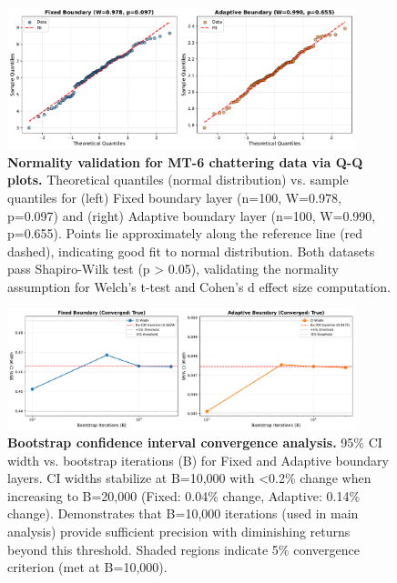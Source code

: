 %
%

\begin{figure}[htbp]
\centering
\includegraphics[width=0.9\textwidth]{figures/figure_vi_1_normality_validation.pdf}
\caption{%
\textbf{Normality validation for MT-6 chattering data via Q-Q plots.}
Theoretical quantiles (normal distribution) vs. sample quantiles for
(left) Fixed boundary layer (n=100, W=0.978, p=0.097) and
(right) Adaptive boundary layer (n=100, W=0.990, p=0.655).
Points lie approximately along the reference line (red dashed), indicating
good fit to normal distribution. Both datasets pass Shapiro-Wilk test
(p > 0.05), validating the normality assumption for Welch's t-test and
Cohen's d effect size computation.
}
\label{fig:appendix-normality-validation}
\end{figure}

\begin{figure}[htbp]
\centering
\includegraphics[width=0.9\textwidth]{figures/figure_vi_1_bootstrap_convergence.pdf}
\caption{%
\textbf{Bootstrap confidence interval convergence analysis.}
95\% CI width vs. bootstrap iterations (B) for Fixed and Adaptive boundary layers.
CI widths stabilize at B=10,000 with <0.2\% change when increasing to B=20,000
(Fixed: 0.04\% change, Adaptive: 0.14\% change).
Demonstrates that B=10,000 iterations (used in main analysis) provide sufficient
precision with diminishing returns beyond this threshold.
Shaded regions indicate 5\% convergence criterion (met at B=10,000).
}
\label{fig:appendix-bootstrap-convergence}
\end{figure}

